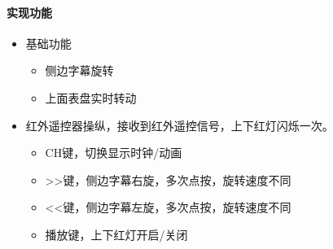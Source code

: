 \documentclass{article}
\begin{document}
\paragraph{实现功能}
\begin{itemize}
    \item 基础功能
    \begin{itemize}
        \item 侧边字幕旋转
        \item 上面表盘实时转动
    \end{itemize}
    \item 红外遥控器操纵，接收到红外遥控信号，上下红灯闪烁一次。
    \begin{itemize}
        \item CH键，切换显示时钟/动画
        \item >>键，侧边字幕右旋，多次点按，旋转速度不同
        \item <<键，侧边字幕左旋，多次点按，旋转速度不同
        \item 播放键，上下红灯开启/关闭
    \end{itemize}
\end{itemize}
\end{document}
